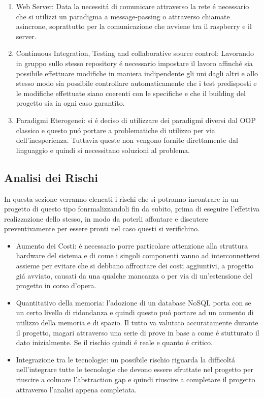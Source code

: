 \begin{enumerate}
  \item Web Server: Data la necessit\'a di comunicare attraverso la rete \'e necessario che si utilizzi un paradigma a message-passing o attraverso chiamate asincrone, soprattutto per la comunicazione che avviene tra il raspberry e il server.
  \item Continuous Integration, Testing and collaborative source control: Lavorando in gruppo sullo stesso repository \'e necessario impostare il lavoro affinch\'e sia possibile effettuare modifiche in maniera indipendente gli uni dagli altri e allo stesso modo sia possibile controllare automaticamente che i test predisposti e le modifiche effettuate siano coerenti con le specifiche e che il building del progetto sia in ogni caso garantito.
  \item{Paradigmi Eterogenei}: si \'e deciso di utilizzare dei paradigmi diversi dal OOP classico e questo pu\'o portare a problematiche di utilizzo per via dell'inesperienza. Tuttavia queste non vengono fornite direttamente dal linguaggio e quindi si necessitano soluzioni al problema.
\end{enumerate}

\subsection{Analisi dei Rischi}

In questa sezione verranno elencati i rischi che si potranno incontrare in un progetto di questo tipo fonrmalizzandoli fin da subito, prima di eseguire l'effettiva realizzazione dello stesso, in modo da poterli affontare e discutere preventivamente per essere pronti nel caso questi si verifichino.

\begin{itemize}
  \item Aumento dei Costi: \'e necessario porre particolare attenzione alla struttura hardware del sistema e di come i singoli componenti vanno ad interconnettersi assieme per evitare che si debbano affrontare dei costi aggiuntivi, a progetto gi\'a avviato, causati da una qualche mancanza o per via di un'estensione del progetto in corso d'opera.
  \item Quantitativo della memoria: l'adozione di un database NoSQL porta con se un certo livello di ridondanza e quindi questo pu\'o portare ad un aumento di utilizzo della memoria e di spazio. Il tutto va valutato accuratamente durante il progetto, magari attraverso una serie di prove in base a come \'e stutturato il dato inizialmente. Se il rischio quindi \'e reale e quanto \'e critico.
  \item Integrazione tra le tecnologie: un possibile rischio riguarda la difficolt\'a nell'integrare tutte le tecnologie che devono essere sfruttate nel progetto per riuscire a colmare l'abstraction gap e quindi riuscire a completare il progetto attraverso l'analisi appena completata.
\end{itemize}
